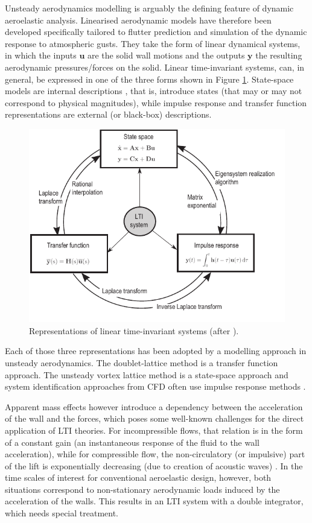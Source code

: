 \documentclass[11pt]{article}
\begin{document}
Unsteady aerodynamics modelling is arguably the defining feature of dynamic aeroelastic analysis. Linearised aerodynamic models have therefore been developed specifically tailored to flutter prediction and simulation of the dynamic response to atmospheric gusts. They take the form of linear dynamical systems, in which the inputs \(\textbf{u}\) are the solid wall motions and the outputs \(\textbf{y}\) the resulting aerodynamic pressures/forces on the solid.  Linear time-invariant systems, can, in general, be expressed in one of the three forms shown in Figure \ref{fig:rosetta_lti}. State-space models are internal descriptions \cite{Antoulas2005}, that is, introduce states (that may or may not correspond to physical magnitudes), while impulse response and transfer function representations are external (or black-box) descriptions. 
\begin{figure}[hbt!]
	\centering
	\includegraphics[width=.6\textwidth]{./img/rosetta_lti.pdf}
	\caption{\label{fig:rosetta_lti} Representations of linear time-invariant systems (after \cite{Brunton2019}).}
\end{figure}

Each of those three representations has been adopted by a modelling approach in unsteady aerodynamics. The doublet-lattice method \cite{Albano1969} is a transfer function approach. The unsteady vortex lattice method \cite{Katz2001} is a state-space approach and system identification approaches from CFD often use impulse response methods \cite{Silva2017}.

Apparent mass effects however introduce a dependency between the acceleration of the wall and the forces, which poses some well-known challenges for the direct application of LTI theories. For incompressible flows, that relation is in the form of a constant gain (an instantaneous response of the fluid to the wall acceleration), while for compressible flow, the non-circulatory (or impulsive) part of the lift is exponentially decreasing (due to  creation of acoustic waves) \cite{Leishman1988}. In the time scales of interest for conventional aeroelastic design, however, both situations correspond to non-stationary aerodynamic loads induced by the acceleration of the walls. This results in an LTI system with a double integrator, which needs special treatment. 
\end{document}
